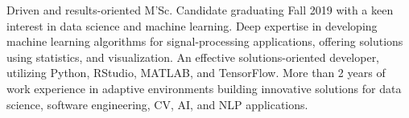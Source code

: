 

\begin{cvparagraph}

Driven and results-oriented M'Sc. Candidate graduating Fall 2019 with a keen interest in data science and machine learning. Deep expertise in developing machine learning algorithms for signal-processing applications, offering solutions using statistics, and visualization. An effective solutions-oriented developer, utilizing Python, RStudio, MATLAB, and TensorFlow. More than 2 years of work experience in adaptive environments building innovative solutions for data science, software engineering, CV, AI, and NLP applications.
\end{cvparagraph}
